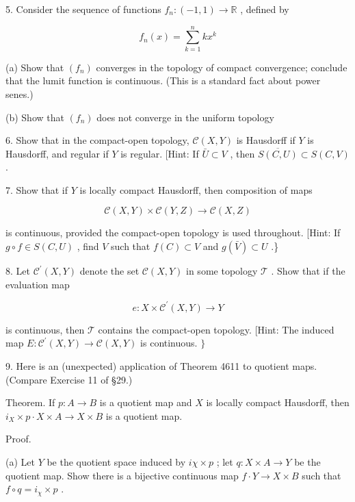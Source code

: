 5. Consider the sequence of functions \({f}_{n} : \left( {-1,1}\right)  \rightarrow  \mathbb{R}\) , defined by

\[
{f}_{n}\left( x\right)  = \mathop{\sum }\limits_{{k = 1}}^{n}k{x}^{k}
\]

(a) Show that \(\left( {f}_{n}\right)\) converges in the topology of compact convergence; conclude that the lumit function is continuous. (This is a standard fact about power senes.)

(b) Show that \(\left( {f}_{n}\right)\) does not converge in the uniform topology

6. Show that in the compact-open topology, \(\mathcal{C}\left( {X,Y}\right)\) is Hausdorff if \(Y\) is Hausdorff, and regular if \(Y\) is regular. [Hint: If \(\bar{U} \subset  V\) , then \(\overline{S\left( {C,U}\right) } \subset  S\left( {C,V}\right)\) .

7. Show that if \(Y\) is locally compact Hausdorff, then composition of maps

\[
\mathcal{C}\left( {X,Y}\right)  \times  \mathcal{C}\left( {Y,Z}\right)  \rightarrow  \mathcal{C}\left( {X,Z}\right)
\]

is continuous, provided the compact-open topology is used throughout. [Hint: If \(g \circ  f \in  S\left( {C,U}\right)\) , find \(V\) such that \(f\left( C\right)  \subset  V\) and \(g\left( \bar{V}\right)  \subset  U\) .\}

8. Let \({\mathcal{C}}^{\prime }\left( {X,Y}\right)\) denote the set \(\mathcal{C}\left( {X,Y}\right)\) in some topology \(\mathcal{T}\) . Show that if the evaluation map

\[
e : X \times  {\mathcal{C}}^{\prime }\left( {X,Y}\right)  \rightarrow  Y
\]

is continuous, then \(\mathcal{T}\) contains the compact-open topology. [Hint: The induced map \(E : {\mathcal{C}}^{\prime }\left( {X,Y}\right)  \rightarrow  \mathcal{C}\left( {X,Y}\right)\) is continuous. \(\}\)

9. Here is an (unexpected) application of Theorem 4611 to quotient maps. (Compare Exercise 11 of §29.)

Theorem. If \(p : A \rightarrow  B\) is a quotient map and \(X\) is locally compact Hausdorff, then \({i}_{X} \times  p \cdot  X \times  A \rightarrow  X \times  B\) is a quotient map.

Proof.

(a) Let \(Y\) be the quotient space induced by \({i\chi } \times  p\) ; let \(q : X \times  A \rightarrow  Y\) be the quotient map. Show there is a bijective continuous map \(f \cdot  Y \rightarrow  X \times  B\) such that \(f \circ  q = {i}_{\chi } \times  p\) .


